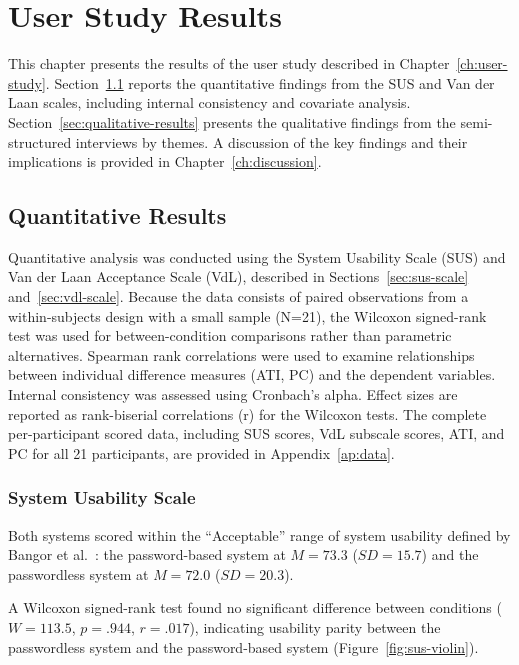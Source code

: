 \chapter{User Study Results}
\label{ch:results}

This chapter presents the results of the user study described in Chapter~\ref{ch:user-study}. Section~\ref{sec:quantitative-results} reports the quantitative findings from the SUS and Van der Laan scales, including internal consistency and covariate analysis. Section~\ref{sec:qualitative-results} presents the qualitative findings from the semi-structured interviews by themes. A discussion of the key findings and their implications is provided in Chapter~\ref{ch:discussion}.

\section{Quantitative Results}
\label{sec:quantitative-results}

Quantitative analysis was conducted using the System Usability Scale (SUS) and Van der Laan Acceptance Scale (VdL), described in Sections~\ref{sec:sus-scale} and~\ref{sec:vdl-scale}. Because the data consists of paired observations from a within-subjects design with a small sample (N=21), the Wilcoxon signed-rank test was used for between-condition comparisons rather than parametric alternatives. Spearman rank correlations were used to examine relationships between individual difference measures (ATI, PC) and the dependent variables. Internal consistency was assessed using Cronbach's alpha. Effect sizes are reported as rank-biserial correlations (r) for the Wilcoxon tests. The complete per-participant scored data, including SUS scores, VdL subscale scores, ATI, and PC for all 21 participants, are provided in Appendix~\ref{ap:data}.

\subsection{System Usability Scale}
\label{sec:sus-results}

Both systems scored within the ``Acceptable'' range of system usability defined by Bangor et al.~\cite{bangor_determining_2009}: the password-based system at $M=73.3$ ($SD=15.7$) and the passwordless system at $M=72.0$ ($SD=20.3$).

A Wilcoxon signed-rank test found no significant difference between conditions ($W=113.5$, $p=.944$, $r=.017$), indicating usability parity between the passwordless system and the password-based system (Figure~\ref{fig:sus-violin}).

